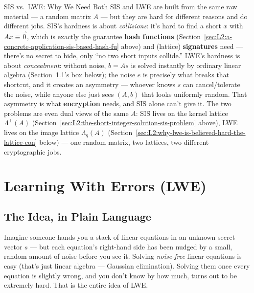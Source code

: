 \begin{rmkbox}{SIS vs.\ LWE: Why We Need Both}
SIS and LWE are built from the same raw material --- a random matrix $A$ --- but they are hard for different reasons and do different jobs. SIS's hardness is about \emph{collisions}: it's hard to find a short $x$ with $Ax\equiv\vec 0$, which is exactly the guarantee \textbf{hash functions} (Section~\ref{sec:L2:a-concrete-application-sis-based-hash-fu} above) and (lattice) \textbf{signatures} need --- there's no secret to hide, only ``no two short inputs collide.'' LWE's hardness is about \emph{concealment}: without noise, $b=As$ is solved instantly by ordinary linear algebra (Section~\ref{sec:L2:the-idea-in-plain-language}'s box below); the noise $e$ is precisely what breaks that shortcut, and it creates an asymmetry --- whoever knows $s$ can cancel/tolerate the noise, while anyone else just sees $(A,b)$ that looks uniformly random. That asymmetry is what \textbf{encryption} needs, and SIS alone can't give it. The two problems are even dual views of the same $A$: SIS lives on the kernel lattice $\Lambda^\perp(A)$ (Section~\ref{sec:L2:the-short-integer-solution-sis-problem} above), LWE lives on the image lattice $\Lambda_q(A)$ (Section~\ref{sec:L2:why-lwe-is-believed-hard-the-lattice-con} below) --- one random matrix, two lattices, two different cryptographic jobs.
\end{rmkbox}

\section{Learning With Errors (LWE)}
\label{sec:L2:learning-with-errors-lwe}

\subsection{The Idea, in Plain Language}
\label{sec:L2:the-idea-in-plain-language}

Imagine someone hands you a stack of linear equations in an unknown secret vector $s$ --- but each equation's right-hand side has been nudged by a small, random amount of noise before you see it. Solving \emph{noise-free} linear equations is easy (that's just linear algebra --- Gaussian elimination). Solving them once every equation is slightly wrong, and you don't know by how much, turns out to be extremely hard. That is the entire idea of LWE.

